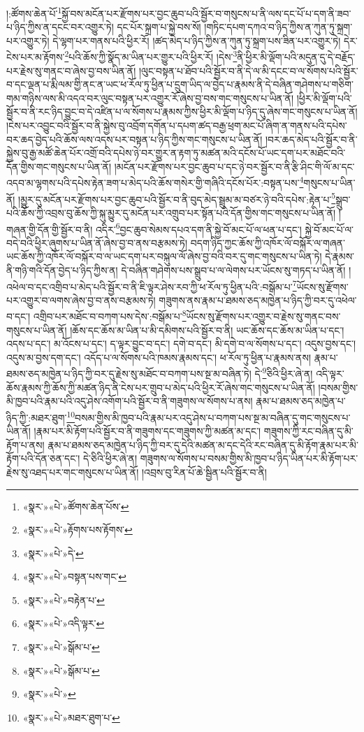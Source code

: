 །:ཚོགས་ཆེན་པོ་\footnote{«སྣར་»«པེ་»ཚོགས་ཆེན་པོས་}སྐྱོ་བས་མངོན་པར་རྫོགས་པར་བྱང་ཆུབ་པའི་སྦྱོར་བ་གསུངས་པ་ནི་ལས་དང་པོ་པ་དག་ནི་ཟབ་པ་ཉིད་ཀྱིས་ན་དངང་བར་འགྱུར་ཏེ། དང་པོར་སྐྲག་པ་སྐྱེ་བས་སོ། །གཏིང་དཔག་དཀའ་བ་ཉིད་ཀྱིས་ན་ཀུན་ཏུ་སྐྲག་པར་འགྱུར་ཏེ། དེ་ལྷག་པར་གནས་པའི་ཕྱིར་རོ། །ཚད་མེད་པ་ཉིད་ཀྱིས་ན་ཀུན་ཏུ་སྐྲག་པས་ཟིན་པར་འགྱུར་ཏེ། དེར་ངེས་པར་མ་རྟོགས་\footnote{«སྣར་»«པེ་»རྟོགས་པས་རྟོགས་}པའི་ཆོས་ཀྱི་སྣོད་མ་ཡིན་པར་གྱུར་པའི་ཕྱིར་རོ། །དེས་\footnote{«སྣར་»«པེ་»དེ་}ནི་ཕྱིར་མི་ལྡོག་པའི་མདུན་དུ་དེ་བརྗོད་པར་རྗེས་སུ་གནང་བ་ཞེས་བྱ་བས་ཡིན་ནོ། །ལུང་བསྟན་པ་ཐོབ་པའི་སྦྱོར་བ་ནི་དེ་ལ་མི་དངང་བ་ལ་སོགས་པའི་སྦྱོར་བ་དང་ལྡན་པ་རྨི་ལམ་གྱི་ནང་ན་ཡང་ཕ་རོལ་ཏུ་ཕྱིན་པ་དྲུག་ཡིད་ལ་བྱེད་པ་རྣམས་ནི་དེ་བཞིན་གཤེགས་པ་གཅིག་གམ་གཉིས་ལས་མི་འདའ་བར་ལུང་བསྟན་པར་འགྱུར་རོ་ཞེས་བྱ་བས་གང་གསུངས་པ་ཡིན་ནོ། །ཕྱིར་མི་ལྡོག་པའི་སྦྱོར་བ་ནི་རང་ཉིད་བྱུང་བ་དེ་འཛིན་པ་ལ་སོགས་པ་རྣམས་ཀྱིས་ཕྱིར་མི་ལྡོག་པ་ཉིད་དུ་ཞེས་གང་གསུངས་པ་ཡིན་ནོ། །ངེས་པར་འབྱུང་བའི་སྦྱོར་བ་ནི་སྐྱེས་བུ་འབྲོག་དགོན་པ་དཔག་ཚད་བརྒྱ་ཕྲག་མང་པོ་ཞིག་ན་གནས་པའི་དཔེས་བར་ཆད་བྱེད་པའི་ཆོས་ལས་འདས་པར་བསྟན་པ་ཉིད་ཀྱིས་གང་གསུངས་པ་ཡིན་ནོ། །བར་ཆད་མེད་པའི་སྦྱོར་བ་ནི་སྐྱེས་བུ་རྒྱ་མཚོ་ཆེན་པོར་འགྲོ་བའི་དཔེས་ཉེ་བར་གྱུར་ན་རྟག་ཏུ་མཚན་མའི་དངོས་པོ་ཡང་དག་པར་མཐོང་བའི་དོན་གྱིས་གང་གསུངས་པ་ཡིན་ནོ། །མངོན་པར་རྫོགས་པར་བྱང་ཆུབ་པ་དང་ཉེ་བར་སྦྱོར་བ་ནི་རྩི་ཤིང་གི་ལོ་མ་དང་འདབ་མ་ལྷགས་པའི་དཔེས་རྟེན་ཟག་པ་མེད་པའི་ཆོས་གསེར་གྱི་གཞིའི་དངོས་པོར་:བསྟན་པས་\footnote{«སྣར་»«པེ་»བསྟན་པས་གང་}གསུངས་པ་ཡིན་ནོ། །མྱུར་དུ་མངོན་པར་རྫོགས་པར་བྱང་ཆུབ་པའི་སྦྱོར་བ་ནི་བུད་མེད་སྦྲུམ་མ་བཙར་ཉེ་བའི་དཔེས་:རྟེན་པ་\footnote{«སྣར་»«པེ་»བརྟེན་པ་}སྒྲུབ་པའི་ཆོས་ཀྱི་འབྲས་བུ་ཆོས་ཀྱི་སྐུ་མྱུར་དུ་མངོན་པར་འགྲུབ་པར་སྟོན་པའི་དོན་གྱིས་གང་གསུངས་པ་ཡིན་ནོ། །གཞན་གྱི་དོན་གྱི་སྦྱོར་བ་ནི། འདིར་\footnote{«སྣར་»«པེ་»འདི་ལྟར་}བྱང་ཆུབ་སེམས་དཔའ་དག་ནི་སྐྱེ་བོ་མང་པོ་ལ་ཕན་པ་དང་། སྐྱེ་བོ་མང་པོ་ལ་བདེ་བའི་ཕྱིར་ཞུགས་པ་ཡིན་ནོ་ཞེས་བྱ་བ་ནས་བརྩམས་ཏེ། བདག་ཉིད་ཀྱང་ཆོས་ཀྱི་འཁོར་ལོ་བསྐོར་ལ་གཞན་ཡང་ཆོས་ཀྱི་འཁོར་ལོ་བསྐོར་བ་ལ་ཡང་དག་པར་བསྐུལ་ལོ་ཞེས་བྱ་བའི་བར་དུ་གང་གསུངས་པ་ཡིན་ཏེ། དེ་རྣམས་ནི་གཉི་གའི་དོན་བྱེད་པ་ཉིད་ཀྱིས་ན། དེ་བཞིན་གཤེགས་པས་སྒྲུབ་པ་ལ་ལེགས་པར་ཡོངས་སུ་གཏད་པ་ཡིན་ནོ། །འཕེལ་བ་དང་འགྲིབ་པ་མེད་པའི་སྦྱོར་བ་ནི་ཇི་ལྟར་ཤེས་རབ་ཀྱི་ཕ་རོལ་ཏུ་ཕྱིན་པའི་:བསྒོམ་པ་\footnote{«སྣར་»«པེ་»སྒོམ་པ་}ཡོངས་སུ་རྫོགས་པར་འགྱུར་བ་ལགས་ཞེས་བྱ་བ་ནས་བརྩམས་ཏེ། གཟུགས་ནས་རྣམ་པ་ཐམས་ཅད་མཁྱེན་པ་ཉིད་ཀྱི་བར་དུ་འཕེལ་བ་དང་། འགྲིབ་པར་མཐོང་བ་བཀག་པས་དེས་:བསྒོམ་པ་\footnote{«སྣར་»«པེ་»སྒོམ་པ་}ཡོངས་སུ་རྫོགས་པར་འགྱུར་བ་རྗེས་སུ་གནང་བས་གསུངས་པ་ཡིན་ནོ། །ཆོས་དང་ཆོས་མ་ཡིན་པ་མི་དམིགས་པའི་སྦྱོར་བ་ནི། ཡང་ཆོས་དང་ཆོས་མ་ཡིན་པ་དང་། འདས་པ་དང་། མ་འོངས་པ་དང་། ད་ལྟར་བྱུང་བ་དང་། དགེ་བ་དང་། མི་དགེ་བ་ལ་སོགས་པ་དང་། འདུས་བྱས་དང་། འདུས་མ་བྱས་དག་དང་། འདོད་པ་ལ་སོགས་པའི་ཁམས་རྣམས་དང་། ཕ་རོལ་ཏུ་ཕྱིན་པ་རྣམས་ནས། རྣམ་པ་ཐམས་ཅད་མཁྱེན་པ་ཉིད་ཀྱི་བར་དུ་རྗེས་སུ་མཐོང་བ་བཀག་པས་སྔ་མ་བཞིན་ཏེ། དེ་\footnote{«སྣར་»«པེ་»}ཅིའི་ཕྱིར་ཞེ་ན། འདི་ལྟར་ཆོས་རྣམས་ཀྱི་ཆོས་ཀྱི་མཚན་ཉིད་ནི་ངེས་པར་གྲུབ་པ་མེད་པའི་ཕྱིར་རོ་ཞེས་གང་གསུངས་པ་ཡིན་ནོ། །བསམ་གྱིས་མི་ཁྱབ་པའི་རྣམ་པའི་འདུ་ཤེས་འགོག་པའི་སྦྱོར་བ་ནི་གཟུགས་ལ་སོགས་པ་ནས། རྣམ་པ་ཐམས་ཅད་མཁྱེན་པ་ཉིད་ཀྱི་:མཐར་ཐུག་\footnote{«སྣར་»«པེ་»མཐར་ཐུག་པ་}བསམ་གྱིས་མི་ཁྱབ་པའི་རྣམ་པར་འདུ་ཤེས་པ་བཀག་པས་སྔ་མ་བཞིན་དུ་གང་གསུངས་པ་ཡིན་ནོ། །རྣམ་པར་མི་རྟོག་པའི་སྦྱོར་བ་ནི་གཟུགས་དང་གཟུགས་ཀྱི་མཚན་མ་དང་། གཟུགས་ཀྱི་རང་བཞིན་དུ་མི་རྟོག་པ་ནས། རྣམ་པ་ཐམས་ཅད་མཁྱེན་པ་ཉིད་ཀྱི་བར་དུ་དེའི་མཚན་མ་དང་དེའི་རང་བཞིན་དུ་མི་རྟོག་རྣམ་པར་མི་རྟོག་པའི་དོན་ཅན་དང་། དེ་ཅིའི་ཕྱིར་ཞེ་ན། གཟུགས་ལ་སོགས་པ་བསམ་གྱིས་མི་ཁྱབ་པ་ཉིད་ཡིན་པར་མི་རྟོག་པར་རྗེས་སུ་འཐད་པར་གང་གསུངས་པ་ཡིན་ནོ། །འབྲས་བུ་རིན་པོ་ཆེ་སྦྱིན་པའི་སྦྱོར་བ་ནི། 